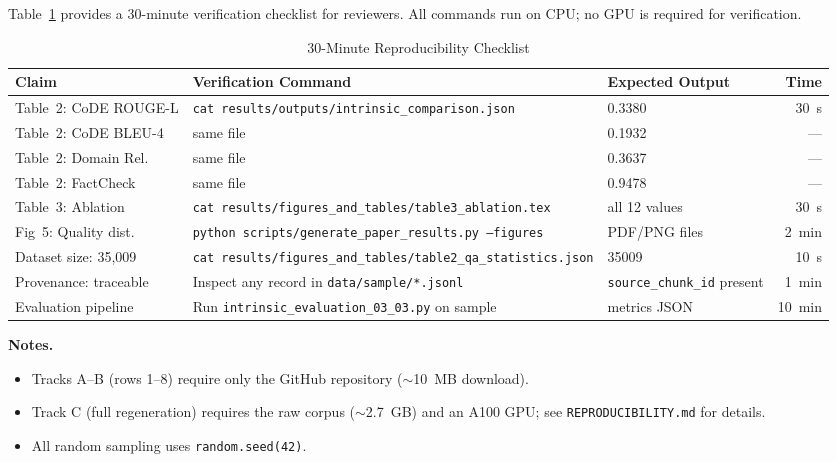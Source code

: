 Table~\ref{tab:reproducibility} provides a 30-minute verification checklist for reviewers. All commands run on CPU; no GPU is required for verification.

\begin{table}[h]
\centering
\caption{30-Minute Reproducibility Checklist}
\label{tab:reproducibility}
\small
\begin{tabular}{@{}p{3.8cm}p{5.5cm}p{2.8cm}r@{}}
\toprule
\textbf{Claim} & \textbf{Verification Command} & \textbf{Expected Output} & \textbf{Time} \\
\midrule
Table~2: CoDE ROUGE-L & \texttt{cat results/outputs/intrinsic\_comparison.json} & 0.3380 & 30~s \\
Table~2: CoDE BLEU-4 & same file & 0.1932 & --- \\
Table~2: Domain Rel. & same file & 0.3637 & --- \\
Table~2: FactCheck & same file & 0.9478 & --- \\
Table~3: Ablation & \texttt{cat results/figures\_and\_tables/table3\_ablation.tex} & all 12 values & 30~s \\
Fig~5: Quality dist. & \texttt{python scripts/generate\_paper\_results.py --figures} & PDF/PNG files & 2~min \\
Dataset size: 35,009 & \texttt{cat results/figures\_and\_tables/table2\_qa\_statistics.json} & 35009 & 10~s \\
Provenance: traceable & Inspect any record in \texttt{data/sample/*.jsonl} & \texttt{source\_chunk\_id} present & 1~min \\
Evaluation pipeline & Run \texttt{intrinsic\_evaluation\_03\_03.py} on sample & metrics JSON & 10~min \\
\bottomrule
\end{tabular}
\end{table}

\noindent\textbf{Notes.}
\begin{itemize}[noitemsep]
    \item Tracks A--B (rows 1--8) require only the GitHub repository ($\sim$10~MB download).
    \item Track C (full regeneration) requires the raw corpus ($\sim$2.7~GB) and an A100 GPU; see \texttt{REPRODUCIBILITY.md} for details.
    \item All random sampling uses \texttt{random.seed(42)}.
\end{itemize}
